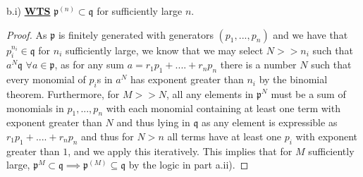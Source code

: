 \documentclass{article}
\newcommand{\fk}[1]{\mathfrak{#1}}
\begin{document}
b.i) \textbf{\underline{WTS}} $\fk{p}^{(n)} \subset \fk{q}$ for sufficiently large $n$.
\begin{proof}
  As $\fk{p}$ is finitely generated with generators $(p_{1},...,p_{n})$ and we have that $p_{i}^{n_{i}} \in \fk{q}$ for $n_{i}$ sufficiently large, we know that we may select $N >> n_{i}$ such that $a^{N} \fk{q}$ $\forall a \in \fk{p}$, as for any sum $a = r_{1}p_{1} + .... + r_{n}p_{n}$ there is a number $N$ such that every monomial of $p_{i}$s in $a^{N}$ has exponent greater than $n_{i}$ by the binomial theorem. Furthermore, for $M >> N$, all any elements in $\fk{p}^{N}$ must be a sum of monomials in $p_{1},...,p_{n}$ with each monomial containing at least one term with exponent greater than $N$ and thus lying in $\fk{q}$ as any  element is expressible as $r_{1}p_{1} + .... + r_{n}p_{n}$ and thus for $N > n$ all terms have at least one $p_{i}$ with exponent greater than $1$, and we apply this iteratively. This implies that for $M$ sufficiently large, $\fk{p}^{M} \subset \fk{q} \implies \fk{p}^{(M)} \subseteq \fk{q}$ by the logic in part a.ii).  
\end{proof}
\end{document}
